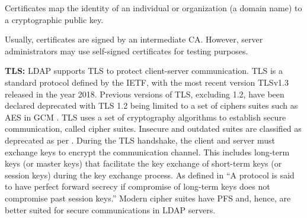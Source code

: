 

Certificates map the identity of an individual or organization (\eg a domain name) to a cryptographic public key.






 Usually, certificates are signed by an intermediate \gls{CA}. However, server administrators may use self-signed certificates for testing purposes.

 
\iffalse
\textbf{\acrfull{TLS}:} \gls{LDAP} supports \gls{TLS} to protect client-server communication. \gls{TLS} is a standard protocol defined by the IETF, with the most recent version TLSv1.3 released in the year 2018. Previous versions of \gls{TLS}, excluding 1.2, have been declared deprecated \cite{rfc8446} with \gls{TLS} 1.2 being limited to a set of ciphers suites such as \acrshort{AES} in \acrshort{GCM} \cite{rfc5288}.
\gls{TLS} uses a set of cryptography algorithms to establish secure communication, called cipher suites. Insecure and outdated suites are classified as deprecated as per \cite{rfc9325}. During the \gls{TLS} handshake, the client and server must exchange keys to encrypt the communication channel. This includes long-term keys (or master keys) that facilitate the key exchange of short-term keys (or session keys) during the key exchange process. As defined in  \cite{handbook-applied-crypto} ``A protocol is said to have perfect forward secrecy if compromise of long-term keys does not compromise past session keys.'' Modern cipher suites have \acrshort{PFS} and, hence, are better suited for secure communications in \gls{LDAP} servers.


